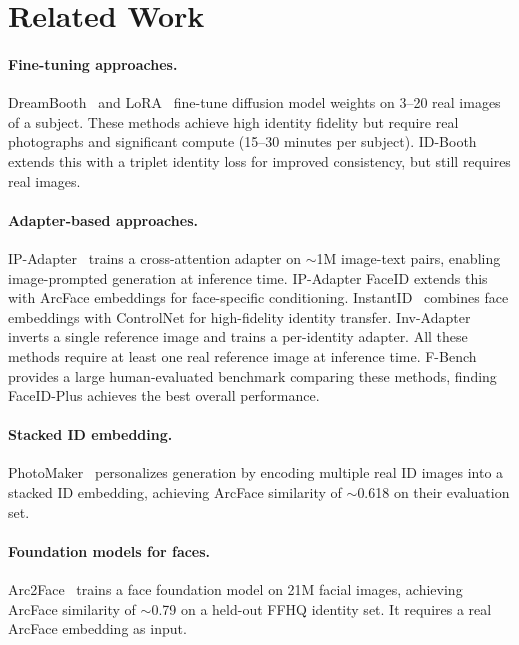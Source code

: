 \documentclass[10pt,twocolumn]{article}
\begin{document}
\section{Related Work}

\paragraph{Fine-tuning approaches.}
DreamBooth~\cite{ruiz2023dreambooth} and LoRA~\cite{hu2022lora} fine-tune diffusion model weights on 3--20 real images of a subject. These methods achieve high identity fidelity but require real photographs and significant compute (15--30 minutes per subject). ID-Booth~\cite{tomasevic2025idbooth} extends this with a triplet identity loss for improved consistency, but still requires real images.

\paragraph{Adapter-based approaches.}
IP-Adapter~\cite{ye2023ipadapter} trains a cross-attention adapter on $\sim$1M image-text pairs, enabling image-prompted generation at inference time. IP-Adapter FaceID extends this with ArcFace embeddings for face-specific conditioning. InstantID~\cite{wang2024instantid} combines face embeddings with ControlNet for high-fidelity identity transfer. Inv-Adapter~\cite{hong2024invadapter} inverts a single reference image and trains a per-identity adapter. All these methods require at least one real reference image at inference time. F-Bench~\cite{liu2025fbench} provides a large human-evaluated benchmark comparing these methods, finding FaceID-Plus achieves the best overall performance.

\paragraph{Stacked ID embedding.}
PhotoMaker~\cite{li2024photomaker} personalizes generation by encoding multiple real ID images into a stacked ID embedding, achieving ArcFace similarity of $\sim$0.618 on their evaluation set.

\paragraph{Foundation models for faces.}
Arc2Face~\cite{papantoniou2024arc2face} trains a face foundation model on 21M facial images, achieving ArcFace similarity of $\sim$0.79 on a held-out FFHQ identity set. It requires a real ArcFace embedding as input.
\end{document}
